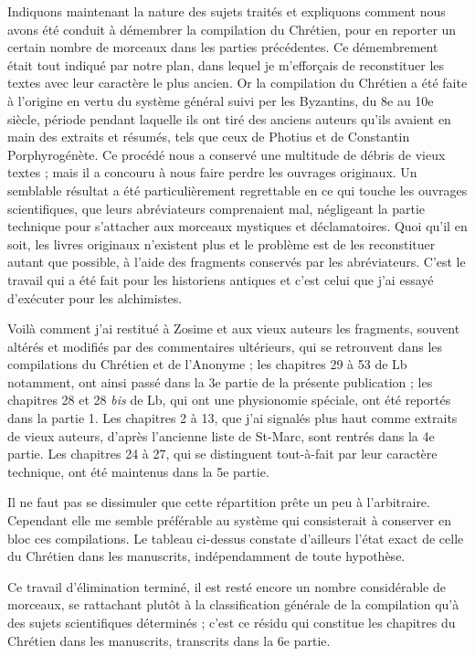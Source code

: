 \documentclass[a4paper, 11pt, oneside, polutonikogreek, french]{article}
\begin{document}
Indiquons maintenant la nature des sujets traités et expliquons comment nous avons été conduit à démembrer la compilation du Chrétien, pour en reporter un certain nombre de morceaux dans les parties précédentes. Ce démembrement était tout indiqué par notre plan, dans lequel je m'efforçais de reconstituer les textes avec leur caractère le plus ancien. Or la compilation du Chrétien a été faite à l'origine en vertu du système général suivi per les Byzantins, du 8e au 10e siècle, période pendant laquelle ils ont tiré des anciens auteurs qu'ils avaient en main des extraits et résumés, tels que ceux de Photius et de Constantin Porphyrogénète. Ce procédé nous a conservé une multitude de débris de vieux textes ; mais il a concouru à nous faire perdre les ouvrages originaux. Un semblable résultat a été particulièrement regrettable en ce qui touche les ouvrages scientifiques, que leurs abréviateurs comprenaient mal, négligeant la partie technique pour s'attacher aux morceaux mystiques et déclamatoires. Quoi qu'il en soit, les livres originaux n'existent plus et le problème est de les reconstituer autant que possible, à l'aide des fragments conservés par les abréviateurs. C'est le travail qui a été fait pour les historiens antiques et c'est celui que j'ai essayé d'exécuter pour les alchimistes.

Voilà comment j'ai restitué à Zosime et aux vieux auteurs les fragments, souvent altérés et modifiés par des commentaires ultérieurs, qui se retrouvent dans les compilations du Chrétien et de l'Anonyme ; les chapitres 29 à 53 de Lb notamment, ont ainsi passé dans la 3e partie de la présente publication ; les chapitres 28 et 28 \emph{bis} de Lb, qui ont une physionomie spéciale, ont été reportés dans la partie 1. Les chapitres 2 à 13, que j'ai signalés plus haut comme extraits de vieux auteurs, d'après l'ancienne liste de St-Marc, sont rentrés dans la 4e partie. Les chapitres 24 à 27, qui se distinguent tout-à-fait par leur caractère technique, ont été maintenus dans la 5e partie.

Il ne faut pas se dissimuler que cette répartition prête un peu à l'arbitraire. Cependant elle me semble préférable au système qui consisterait à conserver en bloc ces compilations. Le tableau ci-dessus constate d'ailleurs l'état exact de celle du Chrétien dans les manuscrits, indépendamment de toute hypothèse.

Ce travail d'élimination terminé, il est resté encore un nombre considérable de morceaux, se rattachant plutôt à la classification générale de la compilation qu'à des sujets scientifiques déterminés ; c'est ce résidu qui constitue les chapitres du Chrétien dans les manuscrits, transcrits dans la 6e partie.
\end{document}
